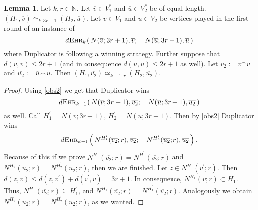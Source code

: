 \documentclass[12pt,notitlepage,a4paper]{article}
\theoremstyle{definition}
\newtheorem{lemma}{Lemma}[section]
\newcommand{\N}{\mathbb{N}}
\newcommand{\ehr}{\textsc{Ehr}}
\begin{document}
\begin{lemma} \label{lemm:Duplicator}
	Let $k,r\in \N$. Let $\overline{v}\in V_1^*$ and
	$\overline{u} \in V_2^*$ be of equal length.
	$(H_1,\overline{v})\simeq_{k,3r+1} (H_2,\overline{u})$.
	Let $v \in V_1$ and $u\in V_2$
	be vertices played in the first round of an instance of 
	\[
	d\ehr_k\left(\, N(\overline{v};3r+1),
	\overline{v}; \quad N(\overline{u};3r+1),\overline{u}\, \right)
	\]
	where Duplicator is following a winning strategy. Further suppose
	that $d(\overline{v},v)\leq 2r+1$ (and in consequence
	$d(\overline{u},u)\leq 2r+1$ as well). 
	Let $\overline{v_2}:=\overline{v}^\smallfrown v$
	and $\overline{u_2}:=\overline{u}\smallfrown u$.
	Then $(H_1,\overline{v_2})\simeq_{k-1,r}
	(H_2,\overline{u_2})$.
\end{lemma}

\begin{proof}
	Using \cref{obs2} we get that Duplicator wins 
	\[
	d\ehr_{k-1}\left(\, N(\overline{v};3r+1),
	\overline{v_2}; \quad N(\overline{u};3r+1)
	,\overline{u_2} \, \right)\]
	as well. Call $H^\prime_1=N(\overline{v};3r+1)$,
	$H^\prime_2=N(\overline{u};3r+1)$. Then by \cref{obs2}
	Duplicator wins
	\[
	d\ehr_{k-1}\left(\, N^{H^\prime_1}(
	\overline{v_2};r),\overline{v_2};\quad
	N^{H^\prime_2}(\overline{u_2};r),\overline{u_2}\, \right).
	\]
	Because of this if we prove $N^{H_1}(\overline{v_2};r)
	=N^{H^\prime_1}(\overline{v_2};r)$ and $N^{H_2}(\overline{u_2};r)
	=N^{H^\prime_2}(\overline{u_2};r)$, then we are finished. 
	Let $z\in N^{H_1}(v^\prime;r)$. Then
	$d(z,\overline{v})\leq d(z,v^\prime)+d(v^\prime,\overline{v})=3r+1$.
	In consequence, $N^{H_1}(v;r)\subset H^\prime_1$. Thus,
	$N^{H_1}(\overline{v_2};r)\subseteq H^\prime_1$, and $N^{H_1}(\overline{v_2};r)
	=N^{H^\prime_1}(\overline{v_2};r)$. Analogously we obtain 
	$N^{H_2}(\overline{u_2};r)=N^{H^\prime_2}(\overline{u_2};r)$, as we wanted. 
\end{proof}
\end{document}
